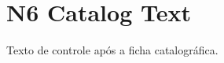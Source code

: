 \documentclass{abntexto-ufc}
\begin{document}
\pretextual

\imprimirfolhaderosto
{}

\textual
\section{N6 Catalog Text}
Texto de controle após a ficha catalográfica.
\end{document}
